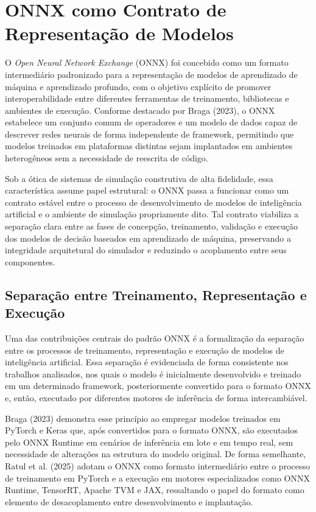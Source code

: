 \section{ONNX como Contrato de Representação de Modelos}

O \emph{Open Neural Network Exchange} (ONNX) foi concebido como um formato intermediário padronizado para a representação de modelos de aprendizado de máquina e aprendizado profundo, com o objetivo explícito de promover interoperabilidade entre diferentes ferramentas de treinamento, bibliotecas e ambientes de execução. Conforme destacado por Braga (2023), o ONNX estabelece um conjunto comum de operadores e um modelo de dados capaz de descrever redes neurais de forma independente de framework, permitindo que modelos treinados em plataformas distintas sejam implantados em ambientes heterogêneos sem a necessidade de reescrita de código.

Sob a ótica de sistemas de simulação construtiva de alta fidelidade, essa característica assume papel estrutural: o ONNX passa a funcionar como um contrato estável entre o processo de desenvolvimento de modelos de inteligência artificial e o ambiente de simulação propriamente dito. Tal contrato viabiliza a separação clara entre as fases de concepção, treinamento, validação e execução dos modelos de decisão baseados em aprendizado de máquina, preservando a integridade arquitetural do simulador e reduzindo o acoplamento entre seus componentes.

\subsection{Separação entre Treinamento, Representação e Execução}

Uma das contribuições centrais do padrão ONNX é a formalização da separação entre os processos de treinamento, representação e execução de modelos de inteligência artificial. Essa separação é evidenciada de forma consistente nos trabalhos analisados, nos quais o modelo é inicialmente desenvolvido e treinado em um determinado framework, posteriormente convertido para o formato ONNX e, então, executado por diferentes motores de inferência de forma intercambiável.

Braga (2023) demonstra esse princípio ao empregar modelos treinados em PyTorch e Keras que, após convertidos para o formato ONNX, são executados pelo ONNX Runtime em cenários de inferência em lote e em tempo real, sem necessidade de alterações na estrutura do modelo original. De forma semelhante, Ratul et al. (2025) adotam o ONNX como formato intermediário entre o processo de treinamento em PyTorch e a execução em motores especializados como ONNX Runtime, TensorRT, Apache TVM e JAX, ressaltando o papel do formato como elemento de desacoplamento entre desenvolvimento e implantação.


